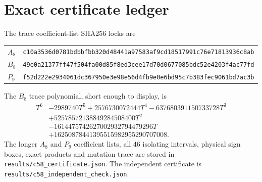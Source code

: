 \section{Exact certificate ledger}

The trace coefficient-list SHA256 locks are
\begin{center}
\begin{tabular}{@{}ll@{}}
\toprule
$A_8$ & \texttt{c10a3536d0781bdbbfbb320d48441a97583af9cd18517991c76e71813936c8ab}\\
$B_8$ & \texttt{49e0a21377ff47f504fa00d85f8ed3cee17d70d0677085bdc52e4203f4ac77fd}\\
$P_9$ & \texttt{f52d222e2934061dc367950e3e98e56d4fb9e0e6bd95c7b383fec9061bd7ac3b}\\
\bottomrule
\end{tabular}
\end{center}
The $B_8$ trace polynomial, short enough to display, is
\begin{align*}
T^6&-2989740T^5+2576730072444T^4-637680391150733728T^3\\
&+52578572138849284508400T^2\\
&-1614475742627002932794479296T\\
&+16250878441395515982955290707008.
\end{align*}
The longer $A_8$ and $P_9$ coefficient lists, all $46$ isolating intervals,
physical sign boxes, exact products and mutation trace are stored in
\texttt{results/c58\_certificate.json}.  The independent certificate is
\texttt{results/c58\_independent\_check.json}.
